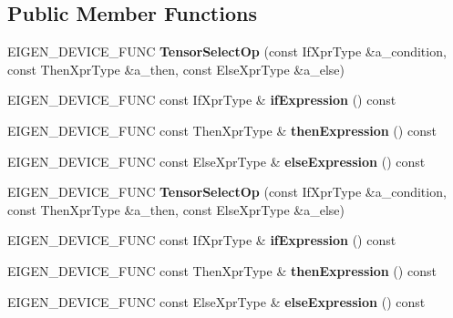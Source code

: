 \subsection*{Public Member Functions}
\begin{DoxyCompactItemize}
\item 
\mbox{\label{class_eigen_1_1_tensor_select_op_a664023d4dfa3616386d2168430cb0103}} 
E\+I\+G\+E\+N\+\_\+\+D\+E\+V\+I\+C\+E\+\_\+\+F\+U\+NC {\bfseries Tensor\+Select\+Op} (const If\+Xpr\+Type \&a\+\_\+condition, const Then\+Xpr\+Type \&a\+\_\+then, const Else\+Xpr\+Type \&a\+\_\+else)
\item 
\mbox{\label{class_eigen_1_1_tensor_select_op_a811fda9c17b090346f497045051bc7e9}} 
E\+I\+G\+E\+N\+\_\+\+D\+E\+V\+I\+C\+E\+\_\+\+F\+U\+NC const If\+Xpr\+Type \& {\bfseries if\+Expression} () const
\item 
\mbox{\label{class_eigen_1_1_tensor_select_op_a9f05264bcc2b90b93683abd8b093e540}} 
E\+I\+G\+E\+N\+\_\+\+D\+E\+V\+I\+C\+E\+\_\+\+F\+U\+NC const Then\+Xpr\+Type \& {\bfseries then\+Expression} () const
\item 
\mbox{\label{class_eigen_1_1_tensor_select_op_ae906bb57e00dce60658aa37855641dcd}} 
E\+I\+G\+E\+N\+\_\+\+D\+E\+V\+I\+C\+E\+\_\+\+F\+U\+NC const Else\+Xpr\+Type \& {\bfseries else\+Expression} () const
\item 
\mbox{\label{class_eigen_1_1_tensor_select_op_a664023d4dfa3616386d2168430cb0103}} 
E\+I\+G\+E\+N\+\_\+\+D\+E\+V\+I\+C\+E\+\_\+\+F\+U\+NC {\bfseries Tensor\+Select\+Op} (const If\+Xpr\+Type \&a\+\_\+condition, const Then\+Xpr\+Type \&a\+\_\+then, const Else\+Xpr\+Type \&a\+\_\+else)
\item 
\mbox{\label{class_eigen_1_1_tensor_select_op_a811fda9c17b090346f497045051bc7e9}} 
E\+I\+G\+E\+N\+\_\+\+D\+E\+V\+I\+C\+E\+\_\+\+F\+U\+NC const If\+Xpr\+Type \& {\bfseries if\+Expression} () const
\item 
\mbox{\label{class_eigen_1_1_tensor_select_op_a9f05264bcc2b90b93683abd8b093e540}} 
E\+I\+G\+E\+N\+\_\+\+D\+E\+V\+I\+C\+E\+\_\+\+F\+U\+NC const Then\+Xpr\+Type \& {\bfseries then\+Expression} () const
\item 
\mbox{\label{class_eigen_1_1_tensor_select_op_ae906bb57e00dce60658aa37855641dcd}} 
E\+I\+G\+E\+N\+\_\+\+D\+E\+V\+I\+C\+E\+\_\+\+F\+U\+NC const Else\+Xpr\+Type \& {\bfseries else\+Expression} () const
\end{DoxyCompactItemize}
